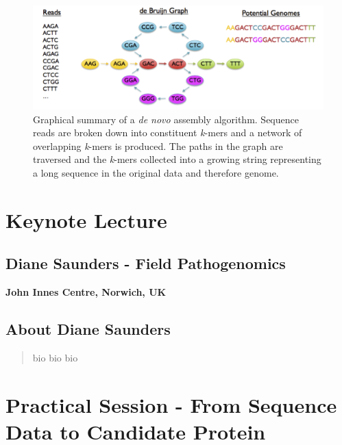 \documentclass[12pt,]{book}
\begin{document}
\begin{figure}
\includegraphics[width=7.01in]{assets/algo} \caption{Graphical summary of a \emph{de novo} assembly algorithm.
Sequence reads are broken down into constituent \emph{k}-mers and a
network of overlapping \emph{k}-mers is produced. The paths in the graph
are traversed and the \emph{k}-mers collected into a growing string
representing a long sequence in the original data and therefore genome.}\label{fig:mainbio}
\end{figure}

\section*{Keynote Lecture}\label{keynote-lecture-1}

\subsection*{Diane Saunders - Field
Pathogenomics}\label{diane-saunders---field-pathogenomics}

\textbf{John Innes Centre, Norwich, UK}

\subsection*{About Diane Saunders}\label{about-diane-saunders}

\begin{quote}
bio bio bio
\end{quote}

\section*{Practical Session - From Sequence Data to Candidate
Protein}\label{practical-session---from-sequence-data-to-candidate-protein}
\end{document}
